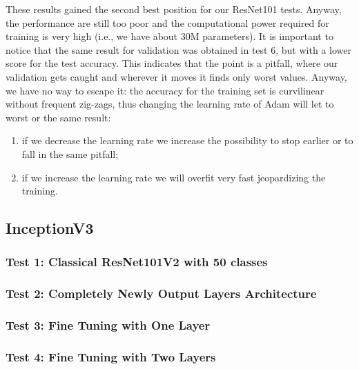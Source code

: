 These results gained the second best position for our ResNet101 tests. Anyway, the performance are still too poor and the computational power required for training is very high (i.e., we have about 30M parameters). It is important to notice that the same result for validation was obtained in test 6, but with a lower score for the test accuracy. This indicates that the point is a pitfall, where our validation gets caught and wherever it moves it finds only worst values.
Anyway, we have no way to escape it: the accuracy for the training set is curvilinear without frequent zig-zags, thus changing the learning rate of Adam will let to worst or the same result:
\begin{enumerate}
\item if we decrease the learning rate we increase the possibility to stop earlier or to fall in the same pitfall;
\item if we increase the learning rate we will overfit very fast jeopardizing the training.
\end{enumerate}


\subsection{InceptionV3}

\subsubsection{Test 1: Classical ResNet101V2 with 50 classes}

\subsubsection{Test 2: Completely Newly Output Layers Architecture}

\subsubsection{Test 3: Fine Tuning with One Layer}

\subsubsection{Test 4: Fine Tuning with Two Layers}


